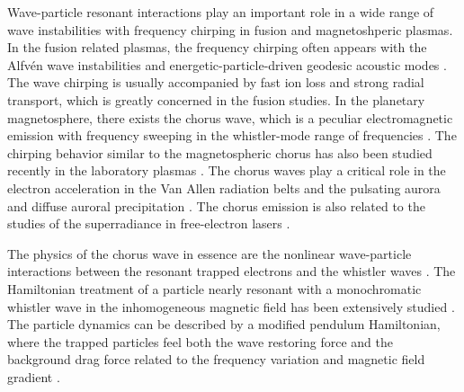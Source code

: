 Wave-particle resonant interactions play an important role  in a wide range of wave instabilities
with frequency chirping in fusion and magnetoshperic plasmas.
In the fusion related plasmas, the frequency chirping often appears with the Alfv\'en wave instabilities \cite{chen2016,wang2018,wang2012,wang2012a} and energetic-particle-driven geodesic acoustic modes \cite{wang2013}.
The wave chirping is usually accompanied by fast ion loss and strong radial transport, which is greatly concerned in the fusion studies.
In the planetary magnetosphere, there exists the chorus wave, which is a peculiar electromagnetic emission with frequency sweeping in the whistler-mode range of frequencies \cite{helliwell1965whistlers,burtis_magnetospheric_1976,tsurutani_postmidnight_1974}. 
The chirping behavior similar to the magnetospheric chorus has also been studied recently in the laboratory plasmas \cite{vancompernolle2015,saitoh2024}.
The chorus waves  play a critical role in the electron acceleration   in the Van Allen radiation belts \cite{horne_wave_2005,thorne_rapid_2013,reeves_electron_2013} and the pulsating aurora  and diffuse auroral precipitation \cite{nishimura_identifying_2010,kasahara_pulsating_2018,thorne_scattering_2010}.
The chorus emission is also related to 
 the studies of the superradiance in free-electron lasers \cite{zonca_nonlinear_2021, soto-chavez2012}.

The physics of the chorus wave in essence are the nonlinear wave-particle interactions \cite{oneil1971,oneil1972} between the resonant trapped electrons and the whistler waves \cite{omura_theory_2008, an2019}.
The Hamiltonian treatment of a particle nearly resonant with a monochromatic whistler wave in the inhomogeneous magnetic field has been extensively studied \cite{albert1993,albert2021}.
The particle dynamics can be described by a modified pendulum Hamiltonian, where the trapped particles feel both the wave restoring force and the background drag force related to the frequency variation and magnetic field gradient \cite{zheng2024,tao_trap-release-amplify_2021}.


